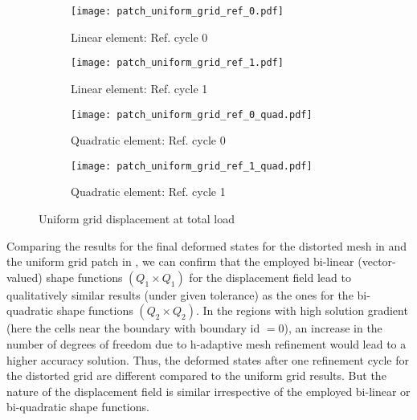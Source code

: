 \begin{figure}[h!]
\centering
\begin{subfigure}[b]{0.35\textwidth}
\centering
\texttt{[image: patch\_uniform\_grid\_ref\_0.pdf]}
\caption{Linear element: Ref. cycle 0}
\label{fig:2.3.1}
\end{subfigure}
\begin{subfigure}[b]{0.35\textwidth}
\centering
\texttt{[image: patch\_uniform\_grid\_ref\_1.pdf]}
\caption{Linear element: Ref. cycle 1}
\label{fig:2.3.2}
\end{subfigure}
\begin{subfigure}[b]{0.35\textwidth}
\centering
\texttt{[image: patch\_uniform\_grid\_ref\_0\_quad.pdf]}
\caption{Quadratic element: Ref. cycle 0}
\label{fig:2.3.3}
\end{subfigure}
\begin{subfigure}[b]{0.35\textwidth}
\centering
\texttt{[image: patch\_uniform\_grid\_ref\_1\_quad.pdf]}
\caption{Quadratic element: Ref. cycle 1}
\label{fig:2.3.4}
\end{subfigure}
\caption{Uniform grid displacement at total load}
\label{fig:2.3}
\end{figure}

Comparing the results for the final deformed states for the distorted mesh in  and the uniform grid patch in , we can confirm that the employed bi-linear (vector-valued) shape functions $(Q_1 \times Q_1)$ for the displacement field lead to qualitatively similar results (under given tolerance) as the ones for the bi-quadratic shape functions $(Q_2 \times Q_2)$. In the regions with high solution gradient (here the cells near the boundary with boundary id $= 0$), an increase in the number of degrees of freedom due to h-adaptive mesh refinement would lead to a higher accuracy solution. Thus, the deformed states after one refinement cycle for the distorted grid are different compared to the uniform grid results. But the nature of the displacement field is similar irrespective of the employed bi-linear or bi-quadratic shape functions. \par 

